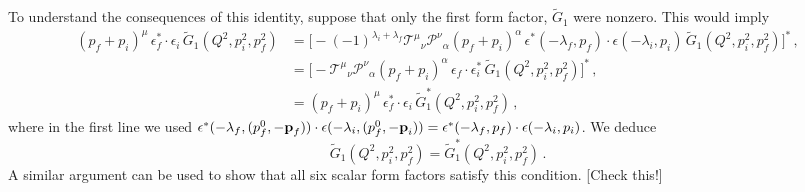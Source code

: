 {To understand the consequences of this identity, suppose that only the first form factor, $\widetilde G_1$ were nonzero. This would imply
\begin{align}
(p_f+p_i)^\mu \,\epsilon_f^*  \cdot \epsilon_i \, \widetilde{G}_1(Q^2,p_i^2,p_f^2) & = \Big [ - (-1)^{\lambda_i+\lambda_f}  \mathcal {T^{\mu}}_\nu  \mathcal {P^{\nu}}_\alpha  (p_f+p_i)^\alpha \,\epsilon^*(- \lambda_f,  p_f) \cdot \epsilon(- \lambda_i,   p_i) \, \widetilde{G}_1(Q^2,p_i^2,p_f^2) \Big ]^* \,, \\
& =  \Big [ -    \mathcal {T^{\mu}}_\nu  \mathcal {P^{\nu}}_\alpha  (p_f+p_i)^\alpha \,\epsilon_f \cdot \epsilon^*_i \, \widetilde{G}_1(Q^2,p_i^2,p_f^2) \Big ]^* \,, \\
& =     (p_f+p_i)^\mu \,\epsilon^*_f \cdot \epsilon_i \, \widetilde{G}^*_1(Q^2,p_i^2,p_f^2)  \,,
\end{align}
where in the first line we used $\epsilon^*(- \lambda_f,  (p^0_f, - \textbf p_f)) \cdot \epsilon(- \lambda_i,   (p^0_f, - \textbf p_i)) = \epsilon^*(- \lambda_f,  p_f) \cdot \epsilon(- \lambda_i,   p_i)$. We deduce
\begin{equation}
\widetilde{G}_1(Q^2,p_i^2,p_f^2)  = \widetilde{G}^*_1(Q^2,p_i^2,p_f^2) \,.
\end{equation}
A similar argument can be used to show that all six scalar form factors satisfy this condition. [Check this!]

\bigskip
}



